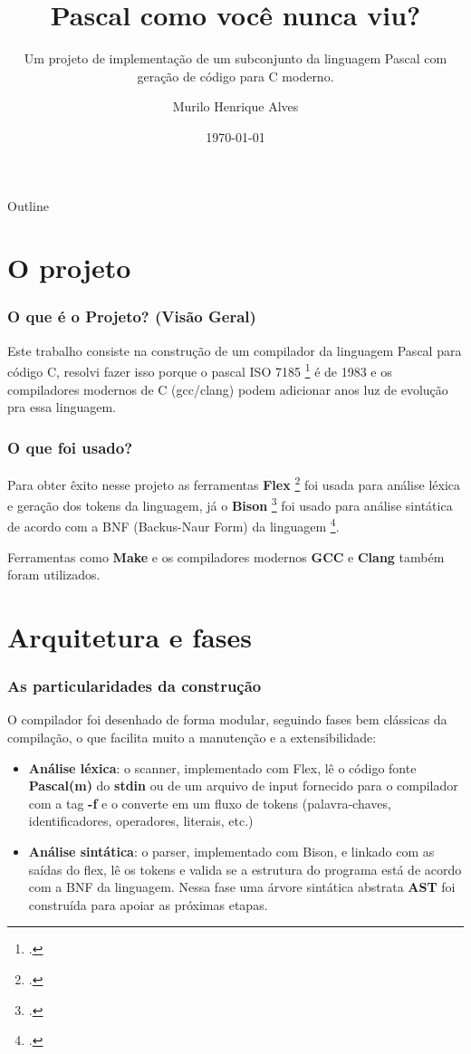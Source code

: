 \documentclass[
	11pt,
	aspectratio=169,
]{beamer}
\title[Linguagens e Compiladores (CAES101)]{Pascal como você nunca viu?}
\subtitle{Um projeto de implementação de um subconjunto da linguagem Pascal com geração de código para C moderno.}
\author[Murilo Alves]{Murilo Henrique Alves}
\institute[UTFPR]{Universidade Tecnológica Federal do Paraná}
\date[\today]{\today}
\begin{document}
\begin{frame}
	\titlepage
\end{frame}

\begin{frame}{Outline}
  \tableofcontents
\end{frame}

\section{O projeto}
\begin{frame}
  \frametitle{O que é o Projeto? (Visão Geral)}
	
  Este trabalho consiste na construção de um compilador da linguagem Pascal para código C,
  resolvi fazer isso porque o pascal ISO 7185 \footcite{iso7185} é de 1983 e os compiladores modernos de C (gcc/clang)
  podem adicionar anos luz de evolução pra essa linguagem.

\end{frame}

\begin{frame}
  \frametitle{O que foi usado?}

  Para obter êxito nesse projeto as ferramentas \textbf{Flex} \footcite{flex} foi usada para análise léxica e geração dos tokens da linguagem,
  já o \textbf{Bison} \footcite{bison} foi usado para análise sintática de acordo com a BNF (Backus-Naur Form) da linguagem \footcite{bnf}.

  Ferramentas como \textbf{Make} e os compiladores modernos \textbf{GCC} e \textbf{Clang} também foram utilizados.
\end{frame}

\section{Arquitetura e fases}

\begin{frame}
	\frametitle{As particularidades da construção}

  O compilador foi desenhado de forma modular, seguindo fases bem clássicas da compilação,
  o que facilita muito a manutenção e a extensibilidade:

  \begin{itemize}
    \item \textbf{Análise léxica}: o scanner, implementado com Flex, lê o código fonte \textbf{Pascal(m)} do \textbf{stdin} ou de um arquivo de input
      fornecido para o compilador com a tag \textbf{-f} e o converte em um fluxo de tokens (palavra-chaves, identificadores, operadores, literais, etc.)
    \item \textbf{Análise sintática}: o parser, implementado com Bison, e linkado com as saídas do flex, lê os tokens e valida se a estrutura do programa está de acordo com a BNF da linguagem. Nessa fase uma árvore sintática abstrata \textbf{AST} foi construída para apoiar as próximas etapas.
  \end{itemize}
\end{frame}
\end{document}
